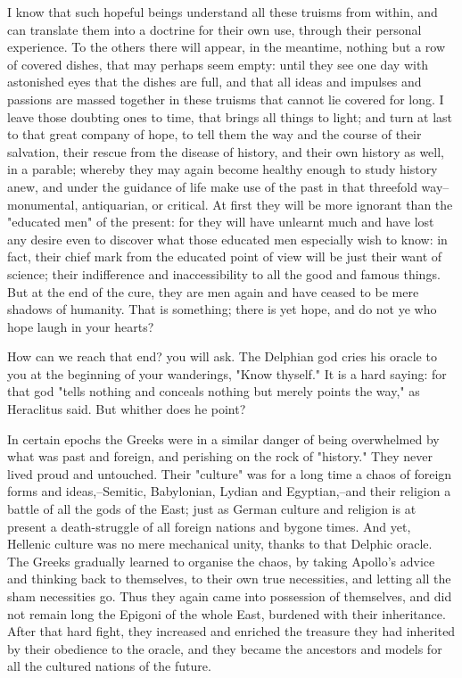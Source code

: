 I know that such hopeful beings understand all these truisms from
within, and can translate them into a doctrine for their own use,
through their personal experience. To the others there will appear,
in the meantime, nothing but a row of covered dishes, that may
perhaps seem empty: until they see one day with astonished eyes that
the dishes are full, and that all ideas and impulses and passions are
massed together in these truisms that cannot lie covered for long. I
leave those doubting ones to time, that brings all things to light;
and turn at last to that great company of hope, to tell them the way
and the course of their salvation, their rescue from the disease of
history, and their own history as well, in a parable; whereby they
may again become healthy enough to study history anew, and under the
guidance of life make use of the past in that threefold
way--monumental, antiquarian, or critical. At first they will be more
ignorant than the "educated men" of the present: for they will have
unlearnt much and have lost any desire even to discover what those
educated men especially wish to know: in fact, their chief mark from
the educated point of view will be just their want of science; their
indifference and inaccessibility to all the good and famous things.
But at the end of the cure, they are men again and have ceased to be
mere shadows of humanity. That is something; there is yet hope, and
do not ye who hope laugh in your hearts?

How can we reach that end? you will ask. The Delphian god cries his
oracle to you at the beginning of your wanderings, "Know thyself." It
is a hard saying: for that god "tells nothing and conceals nothing
but merely points the way," as Heraclitus said. But whither does he
point?

In certain epochs the Greeks were in a similar danger of being
overwhelmed by what was past and foreign, and perishing on the rock
of "history." They never lived proud and untouched. Their "culture"
was for a long time a chaos of foreign forms and ideas,--Semitic,
Babylonian, Lydian and Egyptian,--and their religion a battle of all
the gods of the East; just as German culture and religion is at
present a death-struggle of all foreign nations and bygone times. And
yet, Hellenic culture was no mere mechanical unity, thanks to that
Delphic oracle. The Greeks gradually learned to organise the chaos,
by taking Apollo's advice and thinking back to themselves, to their
own true necessities, and letting all the sham necessities go. Thus
they again came into possession of themselves, and did not remain
long the Epigoni of the whole East, burdened with their inheritance.
After that hard fight, they increased and enriched the treasure they
had inherited by their obedience to the oracle, and they became the
ancestors and models for all the cultured nations of the future.

